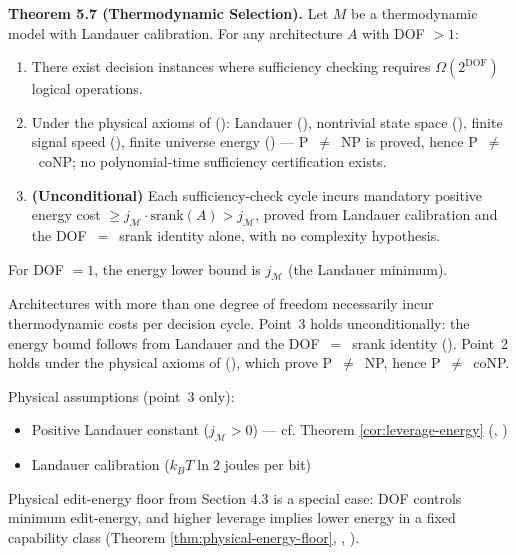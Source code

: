 \begin{formal}
\textbf{Theorem 5.7 (Thermodynamic Selection).} Let $M$ be a thermodynamic model with Landauer calibration. For any architecture $A$ with DOF $> 1$:
\begin{enumerate}
\item There exist decision instances where sufficiency checking requires $\Omega(2^{\text{DOF}})$ logical operations.
\item Under the physical axioms of \cite{paper4_decision_quotient} (): Landauer (), nontrivial state space (), finite signal speed (), finite universe energy () — P~$\neq$~NP is proved, hence P~$\neq$~coNP; no polynomial-time sufficiency certification exists.
\item \textbf{(Unconditional)} Each sufficiency-check cycle incurs mandatory positive energy cost $\geq j_{\mathcal{M}} \cdot \mathrm{srank}(A) > j_{\mathcal{M}}$, proved from Landauer calibration and the DOF~$=$~srank identity alone, with no complexity hypothesis.
\end{enumerate}
For DOF $= 1$, the energy lower bound is $j_{\mathcal{M}}$ (the Landauer minimum).
\end{formal}

\begin{informal}
Architectures with more than one degree of freedom necessarily incur thermodynamic costs per decision cycle. Point~3 holds unconditionally: the energy bound follows from Landauer and the DOF~$=$~srank identity (). Point~2 holds under the physical axioms of \cite{paper4_decision_quotient} (), which prove P~$\neq$~NP, hence P~$\neq$~coNP.
\end{informal}

Physical assumptions (point~3 only):
\begin{itemize}
\item Positive Landauer constant ($j_{\mathcal{M}} > 0$) — cf. Theorem \ref{cor:leverage-energy} (, )
\item Landauer calibration ($k_B T \ln 2$ joules per bit)
\end{itemize}


Physical edit-energy floor from Section 4.3 is a special case: DOF controls minimum edit-energy, and higher leverage implies lower energy in a fixed capability class (Theorem \ref{thm:physical-energy-floor}, , ).

